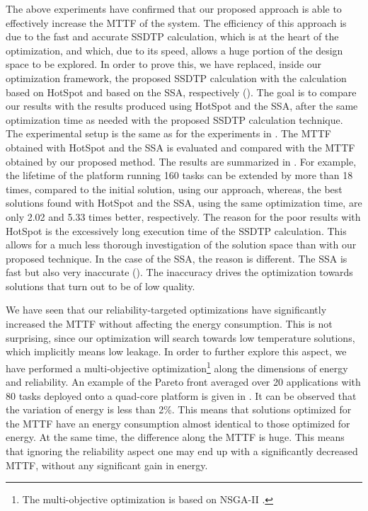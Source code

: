 The above experiments have confirmed that our proposed approach is able to
effectively increase the MTTF of the system. The efficiency of this approach is
due to the fast and accurate SSDTP calculation, which is at the heart of the
optimization, and which, due to its speed, allows a huge portion of the design
space to be explored. In order to prove this, we have replaced, inside our
optimization framework, the proposed SSDTP calculation with the calculation
based on HotSpot and based on the SSA, respectively
(). The goal is to compare our results with the
results produced using HotSpot and the SSA, after the same optimization time as
needed with the proposed SSDTP calculation technique. The experimental setup is
the same as for the experiments in . The MTTF obtained with
HotSpot and the SSA is evaluated and compared with the MTTF obtained by our
proposed method. The results are summarized in . For
example, the lifetime of the platform running 160 tasks can be extended by more
than 18 times, compared to the initial solution, using our approach, whereas,
the best solutions found with HotSpot and the SSA, using the same optimization
time, are only 2.02 and 5.33 times better, respectively. The reason for the poor
results with HotSpot is the excessively long execution time of the SSDTP
calculation. This allows for a much less thorough investigation of the solution
space than with our proposed technique. In the case of the SSA, the reason is
different. The SSA is fast but also very inaccurate
(). The inaccuracy drives the optimization
towards solutions that turn out to be of low quality.

We have seen that our reliability-targeted optimizations have significantly
increased the MTTF without affecting the energy consumption. This is not
surprising, since our optimization will search towards low temperature
solutions, which implicitly means low leakage. In order to further explore this
aspect, we have performed a multi-objective optimization\footnote{The
multi-objective optimization is based on NSGA-II \cite{deb2002}.} along the
dimensions of energy and reliability. An example of the Pareto front averaged
over 20 applications with 80 tasks deployed onto a quad-core platform is given
in . It can be observed that the variation of energy
is less than 2\%. This means that solutions optimized for the MTTF have an
energy consumption almost identical to those optimized for energy. At the same
time, the difference along the MTTF is huge. This means that ignoring the
reliability aspect one may end up with a significantly decreased MTTF, without
any significant gain in energy.

